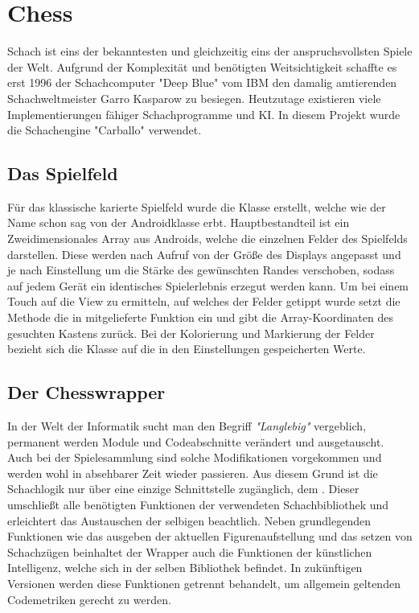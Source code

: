 \section{Chess}
\sectionauthor{\oliver}

Schach ist eins der bekanntesten und gleichzeitig eins der anspruchsvollsten
Spiele der Welt. Aufgrund der Komplexität und benötigten Weitsichtigkeit
schaffte es erst 1996 der Schachcomputer "Deep Blue" vom IBM den damalig
amtierenden Schachweltmeister Garro Kasparow zu besiegen. 
Heutzutage existieren viele Implementierungen fähiger Schachprogramme und KI.
In diesem Projekt wurde die Schachengine "Carballo" verwendet.  

\subsection{Das Spielfeld}

Für das klassische karierte Spielfeld wurde die Klasse
 erstellt, welche wie der Name schon sag von der
Androidklasse  erbt. Hauptbestandteil ist ein Zweidimensionales
Array aus Androids, welche die einzelnen Felder des Spielfelds
darstellen. Diese werden nach Aufruf von  der Größe des
Displays angepasst und je nach Einstellung um die Stärke des gewünschten Randes
verschoben, sodass auf jedem Gerät ein identisches Spielerlebnis erzegut werden
kann. Um bei einem Touch auf die View zu ermitteln, auf welches der Felder
getippt wurde setzt die Methode  die in
 mitgelieferte Funktion  ein und gibt
die Array-Koordinaten des gesuchten Kastens zurück. Bei der Kolorierung und
Markierung der Felder bezieht sich die Klasse auf die in den Einstellungen
gespeicherten Werte.

\subsection{Der Chesswrapper}

In der Welt der Informatik sucht man den Begriff \emph{"Langlebig"} vergeblich,
permanent werden Module und Codeabschnitte verändert und ausgetauscht. Auch bei
der Spielesammlung sind solche Modifikationen vorgekommen und werden wohl in
absehbarer Zeit wieder passieren. Aus diesem Grund ist die Schachlogik nur über
eine einzige Schnittstelle zugänglich, dem . Dieser
umschließt alle benötigten Funktionen der verwendeten Schachbibliothek und
erleichtert das Austauschen der selbigen beachtlich. Neben grundlegenden
Funktionen wie das ausgeben der aktuellen Figurenaufstellung und das setzen von
Schachzügen beinhaltet der Wrapper auch die Funktionen der künstlichen
Intelligenz, welche sich in der selben Bibliothek befindet. In zukünftigen
Versionen werden diese Funktionen getrennt behandelt, um allgemein geltenden
Codemetriken gerecht zu werden. 


